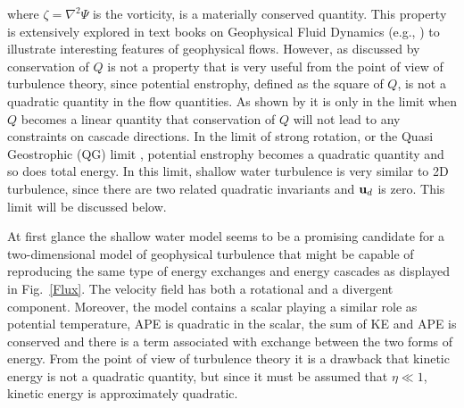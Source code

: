 where $ \zeta =  \nabla^{2} \Psi $ is the vorticity, is a materially conserved quantity. 
This property is extensively explored in text books on Geophysical Fluid Dynamics (e.g., \citet{Vallis:book}) to illustrate interesting features of geophysical flows. { However, as discussed by \citet{Warn1986}  conservation of $ Q $ is not a property that is very useful from the point of view of turbulence theory, since potential enstrophy, defined as the square of $ Q $,  is not a quadratic quantity in the flow quantities.  As shown by \citet{Warn1986} it is only in the limit when $ Q $ becomes a linear quantity that 
 conservation of $ Q $ will not lead to any constraints on cascade directions. }  In the limit of strong rotation, or the Quasi Geostrophic (QG) limit \citep{Charney1971}, potential enstrophy becomes a quadratic quantity and so does total energy.  In this limit,  shallow water turbulence is very similar to 2D turbulence, since there are two related quadratic invariants and $ {\bf u}_d $ is zero. This limit will be discussed below.

At first glance the shallow water model seems to be a promising candidate for a two-dimensional model of geophysical turbulence that might be capable of reproducing the same type of energy exchanges and energy cascades as displayed in Fig.~\ref{Flux}.
The velocity field has both a rotational and a divergent component. Moreover, the model contains a scalar playing a similar role as potential temperature, APE is quadratic in the scalar, 
the sum of KE and APE is conserved and there is a term associated with exchange between the two forms of energy.  From the point of view of turbulence theory it is a drawback that kinetic energy is not a quadratic quantity, but since it must be assumed that $ \eta \ll 1 $, kinetic energy is approximately quadratic. 

